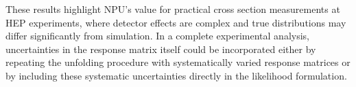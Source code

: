         These results highlight NPU's value for practical cross section measurements at HEP experiments, where detector effects are complex and true distributions may differ significantly from simulation.
        In a complete experimental analysis, uncertainties in the response matrix itself could be incorporated either by repeating the unfolding procedure with systematically varied response matrices or by including these systematic uncertainties directly in the likelihood formulation.

\begin{figure}
\centering
{} 
\\

\end{figure}
